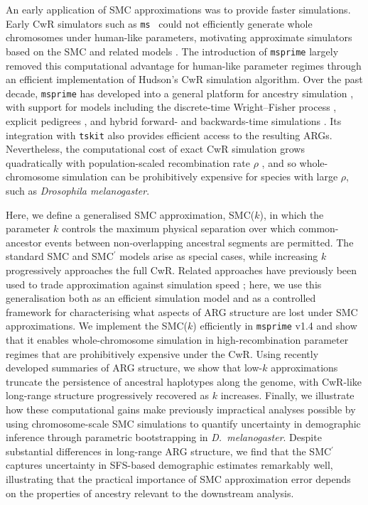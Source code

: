 \documentclass[9pt,twocolumn,twoside,lineno]{gsajnl}
\begin{document}
An early application of SMC approximations was to provide faster simulations.
Early CwR simulators such as
\texttt{ms}~\citep{hudson2002generating} could not efficiently generate whole chromosomes
under human-like parameters, motivating approximate simulators based on the SMC
and related models \citep{marjoram_fast_2006,chen_fast_2009,staab_scrm_2015}. The introduction
of \texttt{msprime} \citep{kelleher_efficient_2016} largely removed this
computational advantage for human-like parameter regimes through an efficient
implementation of Hudson's CwR simulation algorithm. Over the past decade,
\texttt{msprime} has developed into a general platform for ancestry simulation
\citep{ragsdale2020lessons,baumdicker_efficient_2022,kelleher2020coalescent},
with support for models including the discrete-time Wright--Fisher process
\citep{nelson_accounting_2020}, explicit pedigrees
\citep{anderson-trocme_genes_2023}, and hybrid forward- and backwards-time
simulations \citep{kelleher2018efficient,haller2018tree,gopalan_bridging_2025}.
Its integration with \texttt{tskit} \citep{jeffery_population-scale_2026} also
provides efficient access to the resulting ARGs.
Nevertheless, the
computational cost of exact CwR simulation grows quadratically with
population-scaled recombination rate $\rho$ \citep{baumdicker_efficient_2022},
and so whole-chromosome simulation can be
prohibitively expensive for species with
large $\rho$,
such as \emph{Drosophila melanogaster}.

Here, we define a generalised SMC approximation, SMC($k$), in which the
parameter $k$ controls the maximum physical separation over which
common-ancestor events between non-overlapping ancestral segments are
permitted. The standard SMC and SMC$^\prime$ models arise as special cases, while
increasing $k$ progressively approaches the full CwR.
Related approaches have
previously been used to trade approximation against simulation speed
\citep{chen_fast_2009,shlyakhter_cosi2_2014,staab_scrm_2015};
here,  we use this generalisation
both as an efficient simulation model and as a controlled framework for
characterising what aspects of ARG structure are lost under SMC approximations.
We implement the SMC($k$) efficiently in \texttt{msprime} v1.4 and show that it
enables whole-chromosome simulation in high-recombination parameter regimes
that are prohibitively expensive under the CwR.
Using recently developed
summaries of ARG structure, we show that low-$k$ approximations truncate the
persistence of ancestral haplotypes along the genome, with CwR-like long-range
structure progressively recovered as $k$ increases. Finally, we illustrate how
these computational gains make previously impractical analyses possible by
using chromosome-scale SMC simulations to quantify uncertainty in demographic
inference through parametric bootstrapping in \emph{D.\ melanogaster}.
Despite substantial differences in long-range ARG structure, we find that
the SMC$^\prime$ captures uncertainty in SFS-based demographic estimates remarkably
well, illustrating that the practical importance of SMC approximation error
depends on the properties of ancestry relevant to the downstream analysis.
\end{document}
